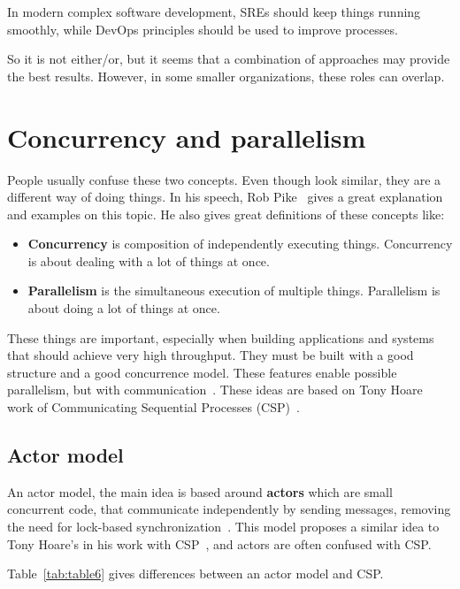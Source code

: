 \noindent
In modern complex software development, SREs should keep things running smoothly, while DevOps principles should be used to improve processes. 

So it is not either/or, but it seems that a combination of approaches may provide the best results. However, in some smaller organizations, these roles can overlap.
%
%
\section{Concurrency and parallelism}\label{sec:concurency_parallelism}
%
People usually confuse these two concepts. Even though look similar, they are a different way of doing things. In his speech, Rob Pike~\cite{Pike} gives a great explanation and examples on this topic. He also gives great definitions of these concepts like:

\begin{itemize}
	\item \textbf{Concurrency} is composition of independently executing things. Concurrency is about dealing with a lot of things at once.
	\item \textbf{Parallelism} is the simultaneous execution of multiple things. Parallelism is about doing a lot of things at once. 
\end{itemize}

\noindent
These things are important, especially when building applications and systems that should achieve very high throughput. They must be built with a good structure and a good concurrence model. These features enable possible parallelism, but with communication~\cite{Pike}. These ideas are based on Tony Hoare work of Communicating Sequential Processes (CSP)~\cite{Hoare78}.

\subsection{Actor model}\label{sec:actor_model}
%
An actor model, the main idea is based around \textbf{actors} which are small concurrent code, that communicate independently by sending messages, removing the need for lock-based synchronization~\cite{Hewitt}. This model proposes a similar idea to Tony Hoare's in his work with CSP~\cite{Hoare78}, and actors are often confused with CSP. 

Table~\ref{tab:table6} gives differences between an actor model and CSP.

